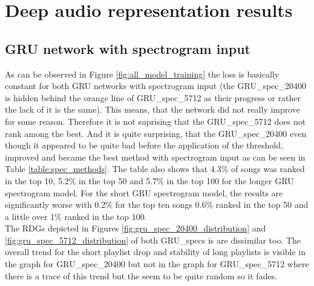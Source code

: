 \section{Deep audio representation results}\label{sec:deep_audio_results}

\subsection{GRU network with spectrogram input}\label{ssec:gru_spec_results}

As can be observed in Figure \ref{fig:all_model_training} the loss is basically constant for both GRU networks with spectrogram input (the GRU\_spec\_20400 is hidden behind the orange line of GRU\_spec\_5712 as their progress or rather the lack of it is the same). This means, that the network did not really improve for some reason. Therefore it is not suprising that the GRU\_spec\_5712 does not rank among the best. And it is quite surprising, that the GRU\_spec\_20400 even though it appeared to be quite bad before the application of the threshold, improved and became the best method with spectrogram input as can be seen in Table \ref{table:spec_methods}. The table also shows that 4.3\% of songs was ranked in the top 10, 5.2\% in the top 50 and 5.7\% in the top 100 for the longer GRU spectrogram model. For the short GRU spectrogram model, the results are significantly worse with 0.2\% for the top ten songs 0.6\% ranked in the top 50 and a little over 1\% ranked in the top 100. \\
The RDGs depicted in Figures \ref{fig:gru_spec_20400_distribution} and \ref{fig:gru_spec_5712_distribution} of both GRU\_specs is are dissimilar too. The overall trend for the short playlist drop and stability of long playlists is visible in the graph for GRU\_spec\_20400 but not in the graph for GRU\_spec\_5712 where there is a trace of this trend but the seem to be quite random so it fades. 

